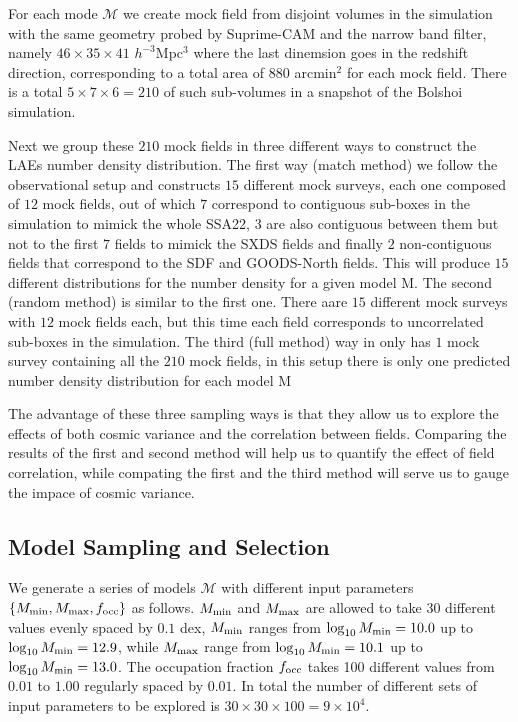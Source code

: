 \documentclass[usenatbib]{mn2e}
\begin{document}
For each mode ${\mathcal M}$ we create mock field from disjoint
volumes in the simulation with the same geometry probed by Suprime-CAM
and the narrow band filter, namely $46\times 35\times 41$
$h^{-3}$Mpc$^{3}$ where the last dinemsion goes in the redshift
direction, corresponding to a total area of $880$ arcmin$^{2}$ for
each mock field. There is a total $5\times 7 \times 6=210$ of such
sub-volumes in a snapshot of the Bolshoi simulation.  

Next we group these $210$ mock fields in three different ways to
construct the LAEs number density distribution. The first way (match method) we
follow the observational setup and constructs $15$ different mock
surveys, each one composed of $12$ mock fields, out of which $7$
correspond to contiguous sub-boxes in the simulation to mimick the
whole SSA22, $3$ are also contiguous between them but not to the first
$7$ fields to mimick the SXDS fields and finally $2$ non-contiguous
fields that correspond to the SDF and GOODS-North fields. This will
produce $15$ different distributions for the number density for a
given model ${\mathrm M}$. The second (random method) is similar to the first
one. There aare $15$ different mock surveys with $12$ mock fields
each, but this time each field corresponds to uncorrelated sub-boxes
in the simulation. The third (full method) way in only has $1$ mock survey
containing all the $210$ mock fields, in this setup there is only one
predicted number density distribution for each model ${\mathrm M}$ 

The advantage of these three sampling ways is that they allow us to
explore the effects of both cosmic variance and the correlation
between fields. Comparing the results of the first and second method
will help us to quantify the effect of field correlation, while
compating the first and the third method will serve us to gauge the
impace of cosmic variance. 


\subsection{Model Sampling and Selection}

We generate a series of models ${\mathcal M}$ with different input
parameters$\{M_{\rm min}, M_{\rm max}, f_{\rm occ}\}$ as
follows. $M_{\rm min}$ and $M_{\rm max}$ are allowed to take 30
different values evenly spaced by $0.1$ dex, $M_{\rm min}$ ranges from
$\log_{10}M_{\rm min}=10.0$ up to $\log_{10}M_{\rm min}=12.9$, while
$M_{\rm max}$ range  from $\log_{10}M_{\rm min}=10.1$ up to
$\log_{10}M_{\rm min}=13.0$. The occupation fraction $f_{\rm occ}$
takes 100 different values from $0.01$ to $1.00$ regularly spaced by
$0.01$. In total the number of different sets of input parameters to
be explored is $30 \times 30\times 100 = 9\times 10^{4}$. 
\end{document}
